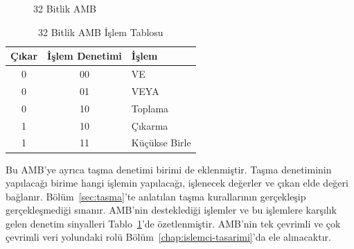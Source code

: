 \begin{figure}[htbp]
\caption{32 Bitlik AMB}
\label{fig:32bit-amb}
\end{figure}

\begin{table}[htbp]
\centering
\caption{32 Bitlik AMB İşlem Tablosu}
\label{tab:amb-islem}
\begin{tabular}{c c l}
\toprule
\textbf{Çıkar} & \textbf{İşlem Denetimi} & \textbf{İşlem} \\
\midrule
0 & 00 & VE \\
0 & 01 & VEYA \\
0 & 10 & Toplama \\
1 & 10 & Çıkarma \\
1 & 11 & Küçükse Birle \\
\bottomrule
\end{tabular}
\end{table}

Bu AMB'ye ayrıca taşma denetimi birimi de eklenmiştir. Taşma denetiminin yapılacağı birime hangi işlemin yapılacağı, işlenecek değerler ve çıkan elde değeri bağlanır. Bölüm~\ref{sec:tasma}'te anlatılan taşma kurallarının gerçekleşip gerçekleşmediği sınanır. AMB'nin desteklediği işlemler ve bu işlemlere karşılık gelen denetim sinyalleri Tablo~\ref{tab:amb-islem}'de özetlenmiştir. AMB'nin tek çevrimli ve çok çevrimli veri yolundaki rolü Bölüm~\ref{chap:islemci-tasarimi}'da ele alınacaktır.

